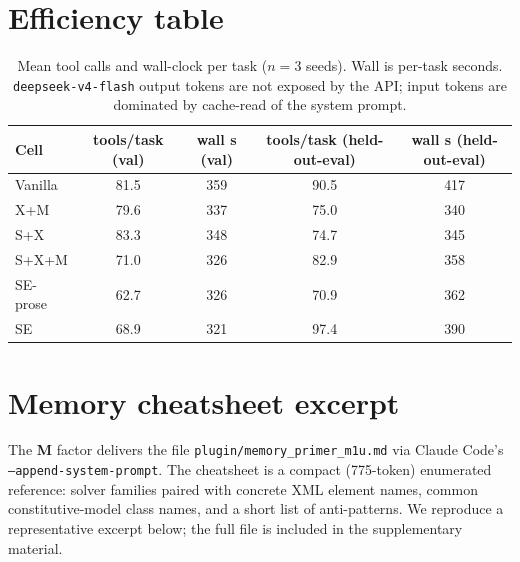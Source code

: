 \documentclass{article}
\begin{document}
\section{Efficiency table}
\label{app:results}

\begin{table}[h]
  \caption{Mean tool calls and wall-clock per task ($n=3$ seeds). Wall is per-task seconds. \texttt{deepseek-v4-flash} output tokens are not exposed by the API; input tokens are dominated by cache-read of the system prompt.}
  \label{tab:efficiency}
  \centering
  \small
  \begin{tabular}{lcccc}
    \toprule
    \textbf{Cell} & \textbf{tools/task (val)} & \textbf{wall s (val)} & \textbf{tools/task (held-out-eval)} & \textbf{wall s (held-out-eval)} \\
    \midrule
    Vanilla  & 81.5 & 359 & 90.5 & 417 \\
    X+M  & 79.6 & 337 & 75.0 & 340 \\
    S+X  & 83.3 & 348 & 74.7 & 345 \\
    S+X+M  & 71.0 & 326 & 82.9 & 358 \\
    SE-prose & 62.7 & 326 & 70.9 & 362 \\
    SE  & 68.9 & 321 & 97.4 & 390 \\
    \bottomrule
  \end{tabular}
\end{table}

\section{Memory cheatsheet excerpt}
\label{app:cheatsheet}

The \textbf{M} factor delivers the file \texttt{plugin/memory\_primer\_m1u.md} via Claude Code's \texttt{--append-system-prompt}. The cheatsheet is a compact (775-token) enumerated reference: solver families paired with concrete XML element names, common constitutive-model class names, and a short list of anti-patterns. We reproduce a representative excerpt below; the full file is included in the supplementary material.
\end{document}
